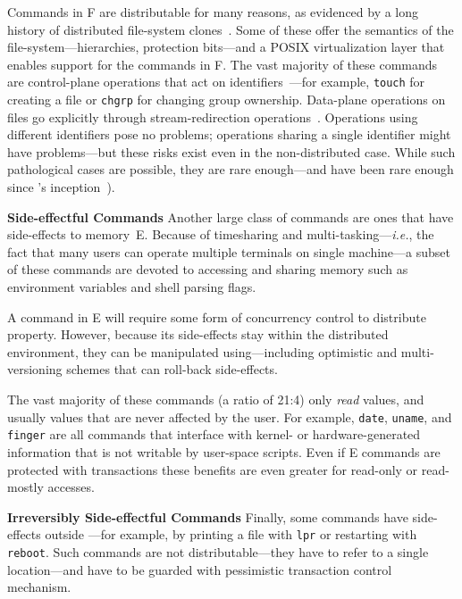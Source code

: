 \documentclass[sigplan,10pt,review,anonymous]{acmart}
\newcommand{\ie}{{\em i.e.}, }
\newcommand{\heading}[1]{\vspace{4pt}\noindent\textbf{#1}\enspace}
\newcommand{\ttt}[1]{\texttt{\small #1}}
\newcommand{\cn}[1]{\mbox{\textcircled{\footnotesize #1}}}
\newcommand{\dfs}{\cn{\textsc{F}}\xspace}
\newcommand{\sid}{\cn{\textsc{E}}\xspace}
\begin{document}
Commands in \dfs are distributable for many reasons, as evidenced by a long history of distributed \unix file-system clones~\cite{catalogue}.
Some of these offer the semantics of the \unix file-system---hierarchies, protection bits---and a POSIX virtualization layer that enables support for the commands in \dfs.
The vast majority of these commands are control-plane operations that act on identifiers~---for example, \ttt{touch} for creating a file or \ttt{chgrp} for changing group ownership.
Data-plane operations on files go explicitly through stream-redirection operations~.
Operations using different identifiers pose no problems;
  operations sharing a single identifier might have problems---but these risks exist even in the non-distributed case.
While such pathological cases are possible, they are rare enough---and have been rare enough since \unix's inception~\cite[\S3.6]{unix}).


\heading{Side-effectful Commands}
Another large class of commands are ones that have side-effects to memory~\sid.
Because of timesharing and multi-tasking---\ie the fact that many users can operate multiple terminals on single \unix machine---a subset of these commands are devoted to accessing and sharing memory such as environment variables and shell parsing flags.

A command in \sid will require some form of concurrency control to distribute property.
However, because its side-effects stay within the distributed \unix environment, they can be manipulated using---including optimistic and multi-versioning schemes that can roll-back side-effects.

The vast majority of these commands (a ratio of 21:4) only \emph{read} values, and usually values that are never affected by the user.
For example, \ttt{date}, \ttt{uname}, and \ttt{finger} are all commands that interface with kernel- or hardware-generated information that is not writable by user-space scripts.
Even if \sid commands are protected with transactions
  these benefits are even greater for read-only or read-mostly accesses.

\heading{Irreversibly Side-effectful Commands}
Finally, some commands have side-effects outside \sys---for example, by printing a file with \ttt{lpr} or restarting with \ttt{reboot}.
Such commands are not distributable---they have to refer to a single location---and have to be guarded with pessimistic transaction control mechanism.
\end{document}
